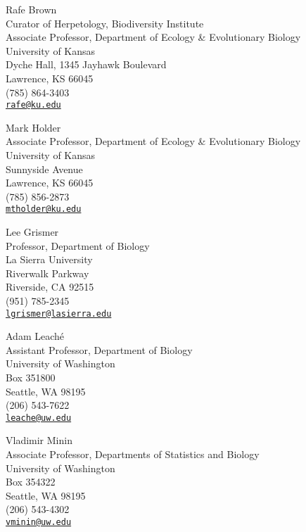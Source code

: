 Rafe Brown \\
\myIndent Curator of Herpetology, Biodiversity Institute \\
\myIndent Associate Professor, Department of Ecology \& Evolutionary Biology \\
\myIndent University of Kansas \\
\myIndent Dyche Hall, 1345 Jayhawk Boulevard \\
\myIndent Lawrence, KS 66045 \\
\myIndent (785) 864-3403 \\
\myIndent \href{mailto:rafe@ku.edu}{\tt rafe@ku.edu}

Mark Holder \\
\myIndent Associate Professor, Department of Ecology \& Evolutionary Biology \\
\myIndent University of Kansas \\
 Sunnyside Avenue \\
\myIndent Lawrence, KS 66045 \\
\myIndent (785) 856-2873 \\
\myIndent \href{mailto:mtholder@ku.edu}{\tt mtholder@ku.edu}

Lee Grismer \\
\myIndent Professor, Department of Biology \\
\myIndent La Sierra University \\
 Riverwalk Parkway \\
\myIndent Riverside, CA 92515 \\
\myIndent (951) 785-2345 \\
\myIndent \href{mailto:lgrismer@lasierra.edu}{\tt lgrismer@lasierra.edu}

Adam Leach\'{e} \\
\myIndent Assistant Professor, Department of Biology \\
\myIndent University of Washington \\
\myIndent Box 351800 \\
\myIndent Seattle, WA 98195\\
\myIndent (206) 543-7622 \\
\myIndent \href{mailto:leache@uw.edu}{\tt leache@uw.edu}

Vladimir Minin \\
\myIndent Associate Professor, Departments of Statistics and Biology\\
\myIndent University of Washington \\
\myIndent Box 354322 \\
\myIndent Seattle, WA 98195\\
\myIndent (206) 543-4302 \\
\myIndent \href{mailto:vminin@uw.edu}{\tt vminin@uw.edu}
